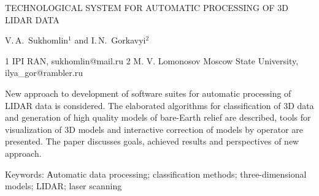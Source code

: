       
      
TECHNOLOGICAL SYSTEM FOR AUTOMATIC PROCESSING OF 
3D LIDAR DATA

V.\,A.~Sukhomlin$^1$ and I.\,N.~Gorkavyi$^2$

1 IPI RAN, sukhomlin@mail.ru
2 M. V. Lomonosov Moscow State University, ilya_gor@rambler.ru

New approach to development of software suites for automatic processing of 
LIDAR data is considered. The elaborated algorithms for classification of 3D data 
and generation of high quality models of bare-Earth relief are described, tools for 
visualization of 3D models and interactive correction of models by operator are 
presented. The paper discusses goals, achieved results and perspectives of new 
approach.

Keywords: Аutomatic data processing; classification methods; three-dimensional 
models; LIDAR; laser scanning